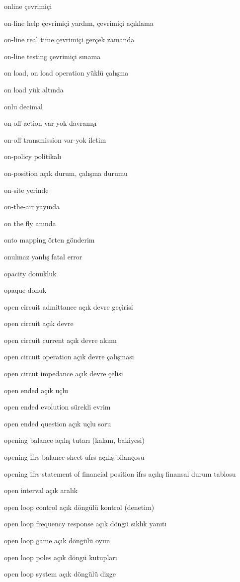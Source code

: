 \documentclass[12pt,fleqn]{article}\usepackage{../../common}
\begin{document}
online çevrimiçi

on-line help çevrimiçi yardım, çevrimiçi açıklama

on-line real time çevrimiçi gerçek zamanda

on-line testing çevrimiçi sınama

on load, on load operation yüklü çalışma

on load yük altında

onlu decimal

on-off action var-yok davranışı

on-off transmission var-yok iletim

on-policy politikalı

on-position açık durum, çalışma durumu

on-site yerinde

on-the-air yayında

on the fly anında

onto mapping örten gönderim

onulmaz yanlış fatal error

opacity donukluk

opaque donuk

open circuit admittance açık devre geçirisi

open circuit açık devre

open circuit current açık devre akımı

open circuit operation açık devre çalışması

open circut impedance açık devre çelisi

open ended açık uçlu

open ended evolution sürekli evrim

open ended question açık uçlu soru

opening balance açılış tutarı (kalanı, bakiyesi)

opening ifrs balance sheet ufrs açılış bilançosu

opening ifrs statement of financial position ifrs açılış finansal durum tablosu

open interval açık aralık

open loop control açık döngülü kontrol (denetim)

open loop frequency response açık döngü sıklık yanıtı

open loop game açık döngülü oyun

open loop poles açık döngü kutupları

open loop system açık döngülü dizge
\end{document}
